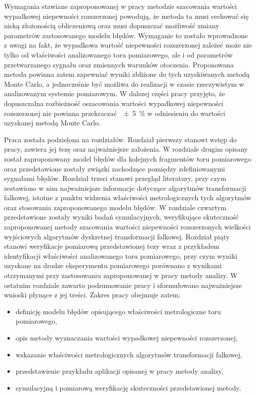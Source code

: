 Wymagania stawiane zaproponowanej w pracy metodzie szacowania wartości wypadkowej niepewności rozszerzonej powodują, że metoda ta musi cechować się niską złożonością obliczeniową oraz musi dopuszczać możliwość zmiany parametrów zastosowanego modelu błędów. Wymaganie to zostało wprowadzone z uwagi na fakt, że wypadkowa wartość niepewności rozszerzonej zależeć może nie tylko od właściwości analizowanego toru pomiarowego, ale i od parametrów przetwarzanego sygnału oraz zmiennych warunków otoczenia. Proponowana metoda powinna zatem zapewniać wyniki zbliżone do tych uzyskiwanych metodą Monte Carlo, a jednocześnie być możliwa do realizacji w czasie rzeczywistym w analizowanym systemie pomiarowym. W dalszej części pracy przyjęto, że dopuszczalna rozbieżność oszacowania wartości wypadkowej niepewności rozszerzonej nie powinna przekraczać~\qty{\pm 5}{\percent} w odniesieniu do wartości uzyskanej metodą Monte Carlo.

Praca została podzielona na  rozdziałów. Rozdział pierwszy stanowi wstęp do pracy, zawiera jej tezę oraz najważniejsze założenia. W rozdziale drugim opisany został zaproponowany model błędów dla kolejnych fragmentów toru pomiarowego oraz przedstawione zostały związki zachodzące pomiędzy zdefiniowanymi sygnałami błędów. Rozdział trzeci stanowi przegląd literatury, przy czym zestawiono w nim najważniejsze informacje dotyczące algorytmów transformacji falkowej, istotne z punktu widzenia właściwości metrologicznych tych algorytmów oraz stosowania zaproponowanego modelu błędów. W rozdziale czwartym przedstawione zostały wyniki badań symulacyjnych, weryfikujące skuteczność zaproponowanej metody szacowania wartości niepewności rozszerzonych wielkości wyjściowych algorytmów dyskretnej transformacji falkowej. Rozdział piąty stanowi weryfikacje pomiarową przedstawionej tezy wraz z przykładem identyfikacji właściwości analizowanego toru pomiarowego, przy czym wyniki uzyskane na drodze eksperymentu pomiarowego porównano z wynikami otrzymanymi przy zastosowaniu zaproponowanej w pracy metody analizy. W ostatnim rozdziale zawarto podsumowanie pracy i sformułowano najważniejsze wnioski płynące z jej treści. Zakres pracy obejmuje zatem:

\begin{itemize}
\item definicję modelu błędów opisującego właściwości metrologiczne toru pomiarowego,
\item opis metody wyznaczania wartości wypadkowej niepewności rozszerzonej,
\item wskazanie właściwości metrologicznych algorytmów transformacji falkowej,
\item przedstawienie przykładu aplikacji opisanej w pracy metody analizy,
\item symulacyjną i pomiarową weryfikację skuteczności przedstawionej metody.
\end{itemize}

